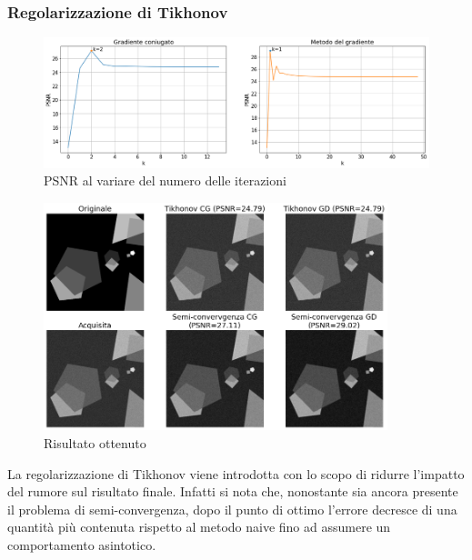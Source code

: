 \documentclass[11pt]{article}
\begin{document}
\subsubsection{Regolarizzazione di Tikhonov}
\begin{figure}[H]
    \centering
    \includegraphics[width=15cm]{semiconvergenza/1/psnr_tikhonov.png}
    \caption{PSNR al variare del numero delle iterazioni}
    \label{fig:semiconv_psnr_tikhonov1}
\end{figure}
\begin{figure}[H]
    \centering
    \includegraphics[width=10cm]{semiconvergenza/1/deblur_tikhonov.png}
    \caption{Risultato ottenuto}
    \label{fig:semiconv_deblur_tikhonov1}
\end{figure}
La regolarizzazione di Tikhonov viene introdotta con lo scopo di ridurre l'impatto del rumore sul risultato finale. 
Infatti si nota che, nonostante sia ancora presente il problema di semi-convergenza, dopo il punto di ottimo l'errore decresce di una quantità più contenuta rispetto al metodo naive fino ad assumere un comportamento asintotico.
\end{document}
